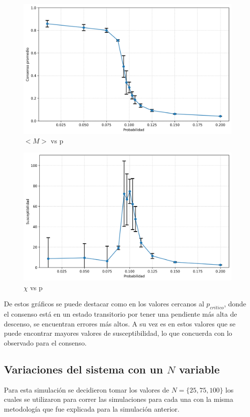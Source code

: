 \documentclass[12pt]{article}
\begin{document}
\begin{figure}[H]
    \centering
    \includegraphics[width=1\textwidth]{magnetization_mean_n_50.png} 
    \caption{$\lt M\gt $ vs p}
\end{figure}

\begin{figure}[H]
    \centering
    \includegraphics[width=1\textwidth]{susceptibility_50.png} 
    \caption{$\chi$ vs p}
\end{figure}

De estos gráficos se puede destacar como en los valores cercanos al $p_{critico}$, donde el consenso está en un estado transitorio por tener una pendiente más alta de descenso, se encuentran errores más altos. A su vez es en estos valores que se puede encontrar mayores valores de susceptibilidad, lo que concuerda con lo observado para el consenso.

\subsection{Variaciones del sistema con un $N$ variable}
Para esta simulación se decidieron tomar los valores de $N = \{25,75,100\}$ los cuales se utilizaron para correr las simulaciones para cada una con la misma metodología que fue explicada para la simulación anterior.
\end{document}
